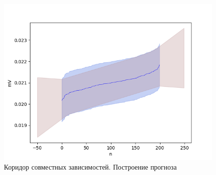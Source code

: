 \begin{figure}[H]
	\begin{center}
		\includegraphics[scale = 0.55]{resources/corridor_of_joint_dependencies_prediction.png}
	\end{center}
	\caption{Коридор совместных зависимостей. Построение прогноза}
\end{figure}


\newpage
